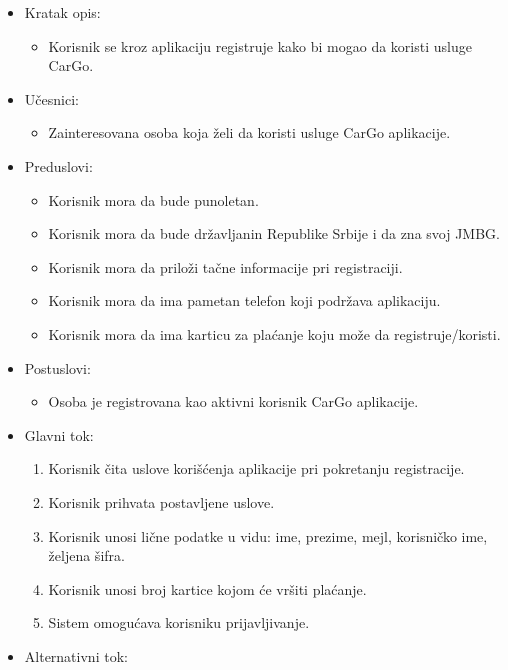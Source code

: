 \begin{itemize}
    \item Kratak opis:
        \begin{itemize}
            \item Korisnik se kroz aplikaciju registruje kako bi mogao da koristi usluge CarGo.
        \end{itemize}
    \item Učesnici:
        \begin{itemize}
            \item Zainteresovana osoba koja želi da koristi usluge CarGo aplikacije.
        \end{itemize}
    \item Preduslovi:
        \begin{itemize}
            \item Korisnik mora da bude punoletan.
            \item Korisnik mora da bude državljanin Republike Srbije i da zna svoj JMBG.
            \item Korisnik mora da priloži tačne informacije pri registraciji.
            \item Korisnik mora da ima pametan telefon koji podržava aplikaciju.
            \item Korisnik mora da ima karticu za plaćanje koju može da registruje/koristi.
        \end{itemize}
    \item Postuslovi:
        \begin{itemize}
            \item Osoba je registrovana kao aktivni korisnik CarGo aplikacije.
        \end{itemize}
    \item Glavni tok:
        \begin{enumerate}
            \item Korisnik čita uslove korišćenja aplikacije pri pokretanju registracije.
            \item Korisnik prihvata postavljene uslove.
            \item Korisnik unosi lične podatke u vidu: ime, prezime, mejl, korisničko ime, željena šifra.
            \item Korisnik unosi broj kartice kojom će vršiti plaćanje.
            \item Sistem omogućava korisniku prijavljivanje.
        \end{enumerate}
    \item Alternativni tok:

\end{itemize}
